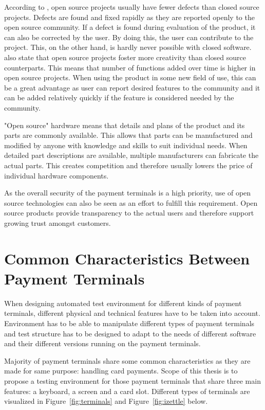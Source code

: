 According to \cite{paulson2004empirical}, open source projects usually have fewer defects than closed source projects. Defects are found and fixed rapidly as they are reported openly to the open source community. If a defect is found during evaluation of the product, it can also be corrected by the user. By doing this, the user can contribute to the project. This, on the other hand, is hardly never possible with closed software. \cite{paulson2004empirical} also state that open source projects foster more creativity than closed source counterparts. This means that number of functions added over time is higher in open source projects. When using the product in some new field of use, this can be a great advantage as user can report desired features to the community and it can be added relatively quickly if the feature is considered needed by the community.

"Open source" hardware means that details and plans of the product and its parts are commonly available. This allows that parts can be manufactured and modified by anyone with knowledge and skills to suit individual needs. When detailed part descriptions are available, multiple manufacturers can fabricate the actual parts. This creates competition and therefore usually lowers the price of individual hardware components.

As the overall security of the payment terminals is a high priority, use of open source technologies can also be seen as an effort to fulfill this requirement. Open source products provide transparency to the actual users and therefore support growing trust amongst customers.

\section{Common Characteristics Between Payment Terminals}
\label{section:payment terminals}

When designing automated test environment for different kinds of payment terminals, different physical and technical features have to be taken into account. Environment has to be able to manipulate different types of payment terminals and test structure has to be designed to adapt to the needs of different software and their different versions running on the payment terminals.

Majority of payment terminals share some common characteristics as they are made for same purpose: handling card payments. Scope of this thesis is to propose a testing environment for those payment terminals that share three main features: a keyboard, a screen and a card slot. Different types of terminals are visualized in Figure~\ref{fig:terminals} and Figure~\ref{fig:izettle} below.

